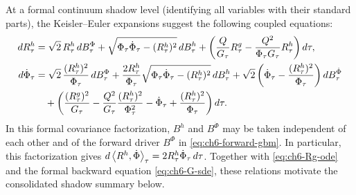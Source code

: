 At a formal continuum shadow level (identifying all variables with their standard parts), the Keisler--Euler expansions suggest the following coupled equations:
\begin{align}
dR_\tau^h &= \sqrt{2}\,R_\tau^h\,dB_\tau^\Phi
             + \sqrt{\Phi_\tau \dot{\Phi}_\tau - (R_\tau^h)^2}\,dB_\tau^h
             + \left(\frac{Q}{G_\tau} R_\tau^g - \frac{Q^2}{\Phi_\tau G_\tau} R_\tau^h\right)d\tau, \label{eq:ch6-Rh-sde} \\
d\dot{\Phi}_\tau &= \sqrt{2}\,\frac{(R_\tau^h)^2}{\Phi_\tau}\,dB_\tau^\Phi
                    + \frac{2 R_\tau^h}{\Phi_\tau}\sqrt{\Phi_\tau \dot{\Phi}_\tau - (R_\tau^h)^2}\,dB_\tau^h
                    + \sqrt{2}\left(\dot{\Phi}_\tau - \frac{(R_\tau^h)^2}{\Phi_\tau}\right)dB_\tau^{\dot{\Phi}} \notag \\
                 &\quad + \left(\frac{(R_\tau^g)^2}{G_\tau} - \frac{Q^2}{G_\tau}\frac{(R_\tau^h)^2}{\Phi_\tau^2} - \dot{\Phi}_\tau + \frac{(R_\tau^h)^2}{\Phi_\tau}\right)d\tau. \label{eq:ch6-dotPhi-sde}
\end{align}
In this formal covariance factorization, $B^h$ and $B^{\dot{\Phi}}$ may be taken independent of each other and of the forward driver $B^\Phi$ in \eqref{eq:ch6-forward-gbm}. In particular, this factorization gives $d\left\langle R^h, \dot{\Phi} \right\rangle_\tau = 2 R_\tau^h \dot{\Phi}_\tau\,d\tau$. Together with \eqref{eq:ch6-Rg-ode} and the formal backward equation \eqref{eq:ch6-G-sde}, these relations motivate the consolidated shadow summary below.

